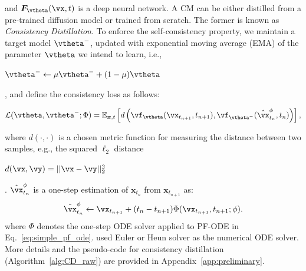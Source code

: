 \documentclass{article} %
\newcommand{\jian}[1]{\textcolor{red}{#1}}
\begin{document}
and $\boldsymbol{F}_\vtheta(\vx,t)$ is a deep neural network. A CM can be either distilled from a pre-trained diffusion model or trained from scratch. The former is known as {\em Consistency Distillation}. 
To enforce the self-consistency property,
we maintain a target model $\vtheta^-$, updated with exponential moving average (EMA) of the parameter $\vtheta$ we intend to learn, i.e., \begin{small}$\vtheta^-\leftarrow\mu\vtheta^-+(1-\mu)\vtheta$\end{small},
and define the consistency loss as follows:
\begin{small}
\begin{equation}
    \mathcal{L}(\vtheta, \vtheta^-;\Phi)=\mathbb{E}_{\boldsymbol{x},t}
    \left[d\left(\vf_\vtheta(\vx_{t_{n+1}},t_{n+1}),\vf_{\vtheta^{-}}(\hat{\vx}^\phi_{t_n},t_n)\right)\right],\label{eq:consistency_loss}
\end{equation}
\end{small}
where $d(\cdot,\cdot)$ is a chosen metric function for measuring the distance between two samples, e.g., the squared $\ell_2$ distance \begin{small}$d(\vx,\vy)=||\vx-\vy||_2^2$\end{small}. 
$\hat{\vx}_{t_n}^\phi$ is a one-step estimation of $\boldsymbol{x}_{t_n}$ from $\boldsymbol{x}_{t_{n+1}}$ as:
\begin{equation}
    \hat{\vx}_{t_n}^\phi\leftarrow \vx_{t_{n+1}}+(t_n-t_{n+1})\Phi(\vx_{t_{n+1}},t_{n+1};\phi).
\end{equation}
where $\Phi$ denotes the one-step ODE solver applied to PF-ODE in Eq.~\ref{eq:simple_pf_ode}. \citep{song2023consistency} used Euler \citep{song2020score} or Heun solver \citep{karras2022elucidating} as the numerical ODE solver.
More details and the pseudo-code for consistency distillation (Algorithm~\ref{alg:CD_raw}) 
are provided in Appendix~\ref{app:preliminary}.


\end{document}
